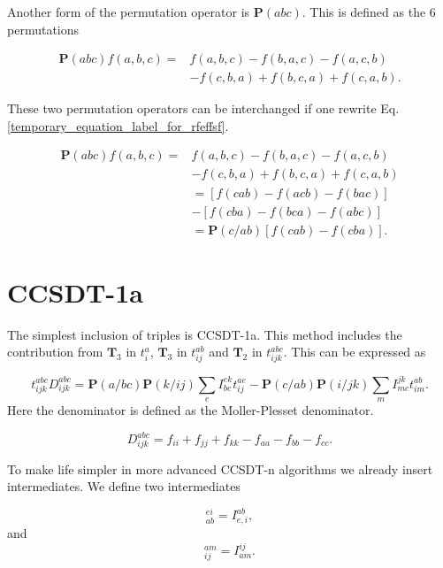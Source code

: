 \documentclass[a4paper,norsk,11pt,twoside]{report}
\begin{document}
Another form of the permutation operator is $\textbf{P}(abc)$. This is defined as the 6 permutations

\begin{align}
\textbf{P}(abc) f(a,b,c) = & f(a,b,c) - f(b,a,c) - f(a,c,b)  \nonumber \\ & - f(c,b,a) + f(b,c,a) + f(c,a,b) . \label{temporary_equation_label_for_rfeffsf}
\end{align}

These two permutation operators can be interchanged if one rewrite Eq. \eqref{temporary_equation_label_for_rfeffsf}. 

\begin{align}
\textbf{P}(abc) f(a,b,c) = & f(a,b,c) - f(b,a,c) - f(a,c,b)  \nonumber \\ & - f(c,b,a) + f(b,c,a) + f(c,a,b) \nonumber \\ &
= \left[ f(cab) - f(acb) - f(bac) \right] \nonumber \\ &
- \left[ f(cba) - f(bca) - f(abc) \right]
\nonumber \\ &
= \textbf{P}(c/ab) \left[ f(cab) - f(cba) \right] .
\end{align}

\section{CCSDT-1a}
The simplest inclusion of triples is CCSDT-1a. This method includes the contribution from $\textbf{T}_3$ in $t_i^a$, $\textbf{T}_3$ in $t_{ij}^{ab}$ and $\textbf{T}_2$ in $t_{ijk}^{abc}$. This can be expressed as

\begin{equation}
t_{ijk}^{abc} D_{ijk}^{abc} = 
\textbf{P}(a/bc) \textbf{P}(k/ij) \sum_e I_{bc}^{ek} t_{ij}^{ae}
- \textbf{P}(c/ab) \textbf{P}(i/jk) \sum_m I_{mc}^{jk} t_{im}^{ab} .
\end{equation}
Here the denominator is defined as the Moller-Plesset denominator. 

\begin{equation}
D_{ijk}^{abc} = f_{ii} + f_{jj} + f_{kk} - f_{aa} - f_{bb} - f_{cc} .
\end{equation}

To make life simpler in more advanced CCSDT-n algorithms we already insert intermediates. We define two intermediates 

\begin{equation}
[X1]_{ab}^{ei} = I_{e,i}^{ab} ,
\end{equation}
and
\begin{equation}
[X2]_{ij}^{am} = I_{am}^{ij} .
\end{equation}
\end{document}
